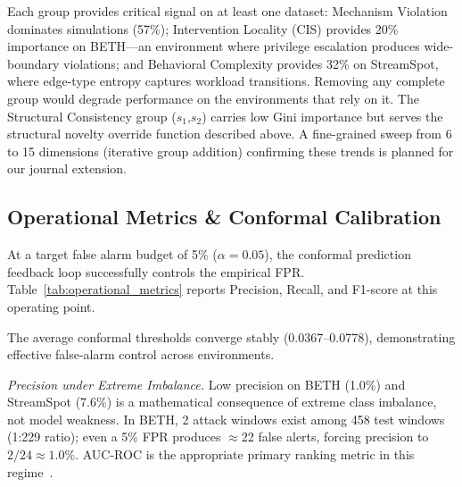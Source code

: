 Each group provides critical signal on at least one dataset: Mechanism Violation dominates simulations (57\%); Intervention Locality (CIS) provides 20\% importance on BETH---an environment where privilege escalation produces wide-boundary violations; and Behavioral Complexity provides 32\% on StreamSpot, where edge-type entropy captures workload transitions. Removing any complete group would degrade performance on the environments that rely on it. The Structural Consistency group ($s_1$,$s_2$) carries low Gini importance but serves the structural novelty override function described above. A fine-grained sweep from 6 to 15 dimensions (iterative group addition) confirming these trends is planned for our journal extension.

\subsection{Operational Metrics \& Conformal Calibration}
At a target false alarm budget of 5\% ($\alpha = 0.05$), the conformal prediction feedback loop successfully controls the empirical FPR. Table~\ref{tab:operational_metrics} reports Precision, Recall, and F1-score at this operating point.

\begin{table}[htbp]
\centering
\caption{Operational metrics at $\alpha\!=\!0.05$ FPR budget. F1\,=\,$2PR/(P\!+\!R)$. $\dagger$BETH/SS precision is low due to class imbalance (see text).}
\label{tab:operational_metrics}
\end{table}

The average conformal thresholds converge stably (0.0367--0.0778), demonstrating effective false-alarm control across environments.

\textit{Precision under Extreme Imbalance.} Low precision on BETH (1.0\%) and StreamSpot (7.6\%) is a mathematical consequence of extreme class imbalance, not model weakness. In BETH, 2 attack windows exist among 458 test windows (1:229 ratio); even a 5\% FPR produces $\approx$22 false alerts, forcing precision to $2/24 \approx 1.0\%$. AUC-ROC is the appropriate primary ranking metric in this regime~\cite{davis2006prec}.

